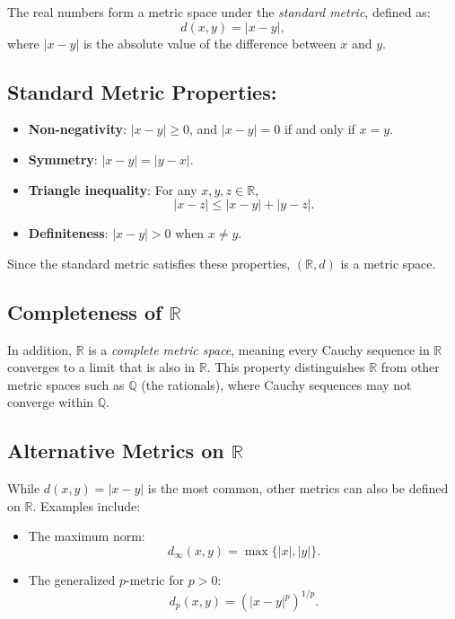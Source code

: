 The real numbers form a metric space under the \textit{standard metric}, defined as:
\[
d(x, y) = |x - y|,
\]
where \( |x - y| \) is the absolute value of the difference between \( x \) and \( y \).

\subsection{Standard Metric Properties:}

\begin{itemize}
    \item \textbf{Non-negativity}: \( |x - y| \geq 0 \), and \( |x - y| = 0 \) if and only if \( x = y \).
    \item \textbf{Symmetry}: \( |x - y| = |y - x| \).
    \item \textbf{Triangle inequality}: For any \( x, y, z \in \mathbb{R} \),
    \[
    |x - z| \leq |x - y| + |y - z|.
    \]
    \item \textbf{Definiteness}: \( |x - y| > 0 \) when \( x \neq y \).
\end{itemize}

Since the standard metric satisfies these properties, \( (\mathbb{R}, d) \) is a metric space.

\subsection{Completeness of \( \mathbb{R} \)}
In addition, \( \mathbb{R} \) is a \textit{complete metric space}, meaning every Cauchy sequence in \( \mathbb{R} \) converges to a limit that is also in \( \mathbb{R} \). This property distinguishes \( \mathbb{R} \) from other metric spaces such as \( \mathbb{Q} \) (the rationals), where Cauchy sequences may not converge within \( \mathbb{Q} \).

\subsection{Alternative Metrics on \( \mathbb{R} \)}
While \( d(x, y) = |x - y| \) is the most common, other metrics can also be defined on \( \mathbb{R} \). Examples include:

\begin{itemize}
    \item The maximum norm:
    \[
    d_\infty(x, y) = \max\{|x|, |y|\}.
    \]
    \item The generalized \( p \)-metric for \( p > 0 \):
    \[
    d_p(x, y) = (|x - y|^p)^{1/p}.
    \]
\end{itemize}

